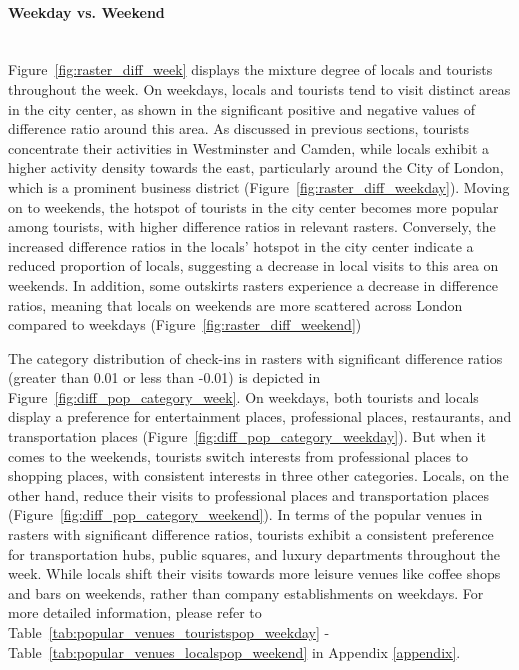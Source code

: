\documentclass{article}
\newcommand{\subsubsubsection}[1]{\paragraph{#1}\mbox{}\\}
\theoremstyle{remark}
\begin{document}
\subsubsubsection{Weekday vs. Weekend}
Figure~\ref{fig:raster_diff_week} displays the mixture degree of locals and tourists throughout the week. On weekdays, locals and tourists tend to visit distinct areas in the city center, as shown in the significant positive and negative values of difference ratio around this area. As discussed in previous sections, tourists concentrate their activities in Westminster and Camden, while locals exhibit a higher activity density towards the east, particularly around the City of London, which is a prominent business district (Figure~\ref{fig:raster_diff_weekday}). Moving on to weekends, the hotspot of tourists in the city center becomes more popular among tourists, with higher difference ratios in relevant rasters. Conversely, the increased difference ratios in the locals' hotspot in the city center indicate a reduced proportion of locals, suggesting a decrease in local visits to this area on weekends. In addition, some outskirts rasters experience a decrease in difference ratios, meaning that locals on weekends are more scattered across London compared to weekdays (Figure~\ref{fig:raster_diff_weekend})

The category distribution of check-ins in rasters with significant difference ratios (greater than 0.01 or less than -0.01) is depicted in Figure~\ref{fig:diff_pop_category_week}. On weekdays, both tourists and locals display a preference for entertainment places, professional places, restaurants, and transportation places (Figure~\ref{fig:diff_pop_category_weekday}). But when it comes to the weekends, tourists switch interests from professional places to shopping places, with consistent interests in three other categories. Locals, on the other hand, reduce their visits to professional places and transportation places (Figure~\ref{fig:diff_pop_category_weekend}). In terms of the popular venues in rasters with significant difference ratios, tourists exhibit a consistent preference for transportation hubs, public squares, and luxury departments throughout the week. While locals shift their visits towards more leisure venues like coffee shops and bars on weekends, rather than company establishments on weekdays. For more detailed information, please refer to Table~\ref{tab:popular_venues_touristspop_weekday} - Table~\ref{tab:popular_venues_localspop_weekend} in Appendix \ref{appendix}.
\end{document}
